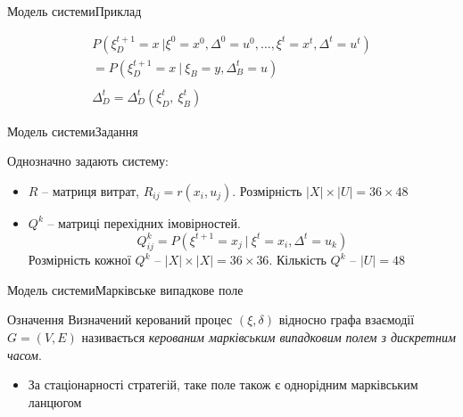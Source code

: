 \documentclass[pdf]{beamer}
\begin{document}
\begin{frame}{Модель системи}{Приклад}
	\begin{center}
	\end{center}
	
	\begin{gather*}
	P(\xi_D^{t+1} = x\ |\xi^0 = x^0, \Delta^0 = u^0, \ldots, \xi^t = x^t, \Delta^t = u^t) \\
	= P(\xi_D^{t+1} = x\ |\ \xi_B = y, \Delta_B^t = u) \\
	\\
	\Delta_D^{t} = \Delta_D^{t}(\xi_D^t,\ \xi_B^t)
	\end{gather*}
\end{frame}


\begin{frame}{Модель системи}{Задання}

Однозначно задають систему:
\begin{itemize}
	\item \(R\) – матриця витрат, \(R_{ij} = r(x_i, u_j)\). Розмірність \(|X| \times |U| = 36 \times 48\)
	\item \(Q^k\) – матриці перехідних імовірностей. 
	\[Q_{ij}^k = P(\xi^{t+1} = x_j\ |\ \xi^t = x_i, \Delta^t = u_k)\]
	Розмірність кожної \(Q^k\) – \(|X| \times |X| = 36 \times 36\). Кількість \(Q^k\) – \(|U| = 48\)
\end{itemize}

\end{frame}


\begin{frame}{Модель системи}{Марківське випадкове поле}
\begin{block}{Означення}
Визначений керований процес \((\xi, \delta)\) відносно графа взаємодії \(G = (V, E)\) називається \textit{керованим марківським випадковим полем з дискретним часом}.
\end{block}
\begin{itemize}
\item<2->{За стаціонарності стратегій, таке поле також є однорідним марківським ланцюгом}
\end{itemize}
\end{frame}
\end{document}
